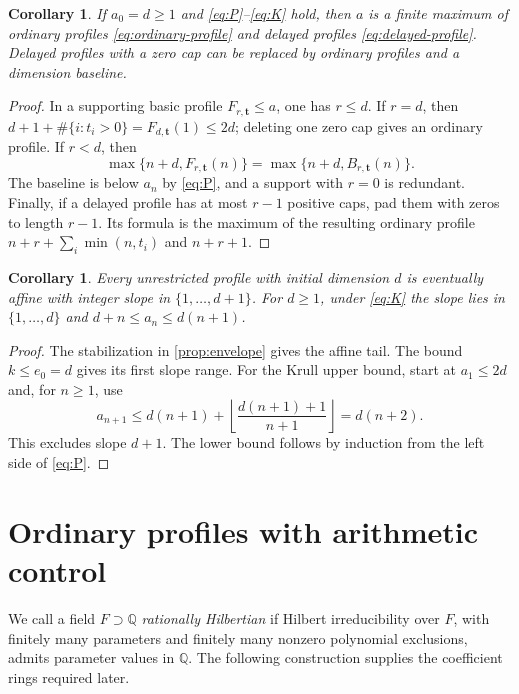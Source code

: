 \documentclass[11pt,reqno]{amsart}
\numberwithin{equation}{section}
\theoremstyle{plain}
\newtheorem{corollary}[theorem]{Corollary}
\theoremstyle{definition}
\theoremstyle{remark}
\begin{document}
\begin{corollary}\label{cor:krull-envelope}
If \(a_0=d\ge1\) and \eqref{eq:P}--\eqref{eq:K} hold,
then \(a\) is a finite maximum of ordinary profiles
\eqref{eq:ordinary-profile} and delayed profiles
\eqref{eq:delayed-profile}. Delayed profiles with a zero cap can
be replaced by ordinary profiles and a dimension baseline.
\end{corollary}
\begin{proof}
In a supporting basic profile \(F_{r,\mathbf t}\le a\), one
has \(r\le d\). If \(r=d\), then
\(d+1+\#\{i:t_i>0\}=F_{d,\mathbf t}(1)\le2d\); deleting
one zero cap gives an ordinary profile. If \(r<d\), then
\[
 \max\{n+d,F_{r,\mathbf t}(n)\}
 =\max\{n+d,B_{r,\mathbf t}(n)\}.
\]
The baseline is below \(a_n\) by \eqref{eq:P}, and a support
with \(r=0\) is redundant. Finally, if a delayed profile has
at most \(r-1\) positive caps, pad them with zeros to length
\(r-1\). Its formula is the maximum of the resulting ordinary
profile \(n+r+\sum_i\min(n,t_i)\) and \(n+r+1\).
\end{proof}

\begin{corollary}\label{cor:growth}
Every unrestricted profile with initial dimension \(d\) is
eventually affine with integer slope in \(\{1,\ldots,d+1\}\).
For \(d\ge1\), under \eqref{eq:K} the slope lies in \(\{1,\ldots,d\}\) and
\(d+n\le a_n\le d(n+1)\).
\end{corollary}
\begin{proof}
The stabilization in \cref{prop:envelope} gives the affine tail.
The bound \(k\le e_0=d\) gives its first slope range.
For the Krull upper bound, start at \(a_1\le2d\) and, for
\(n\ge1\), use
\[
 a_{n+1}\le d(n+1)+
 \left\lfloor\frac{d(n+1)+1}{n+1}\right\rfloor=d(n+2).
\]
This excludes slope \(d+1\). The lower bound follows by induction
from the left side of \eqref{eq:P}.
\end{proof}

\section{Ordinary profiles with arithmetic control}\label{sec:ordinary}

We call a field \(F\supset\mathbb Q\) \emph{rationally Hilbertian} if
Hilbert irreducibility over \(F\), with finitely many parameters and
finitely many nonzero polynomial exclusions, admits parameter values
in \(\mathbb Q\). The following construction supplies the coefficient
rings required later.
\end{document}
